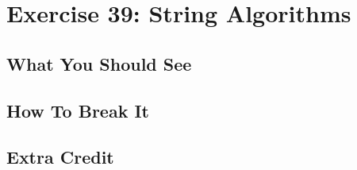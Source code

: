 \chapter{Exercise 39: String Algorithms}



\section{What You Should See}


\section{How To Break It}


\section{Extra Credit}



